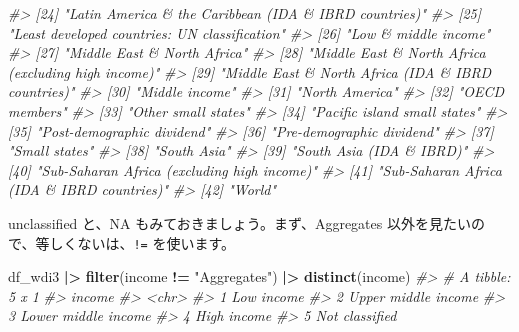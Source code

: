 \documentclass[
  xelatex, ja=standard]{bxjsbook}
\newenvironment{Shaded}{\begin{snugshade}}{\end{snugshade}}
\newcommand{\CommentTok}[1]{\textcolor[rgb]{0.56,0.35,0.01}{\textit{#1}}}
\newcommand{\FunctionTok}[1]{\textcolor[rgb]{0.13,0.29,0.53}{\textbf{#1}}}
\newcommand{\NormalTok}[1]{#1}
\newcommand{\SpecialCharTok}[1]{\textcolor[rgb]{0.81,0.36,0.00}{\textbf{#1}}}
\newcommand{\StringTok}[1]{\textcolor[rgb]{0.31,0.60,0.02}{#1}}
\theoremstyle{definition}
\theoremstyle{definition}
\theoremstyle{definition}
\theoremstyle{definition}
\theoremstyle{remark}
\begin{document}
\begin{Shaded}
\begin{Highlighting}[]
\CommentTok{\#\textgreater{} [24] "Latin America \& the Caribbean (IDA \& IBRD countries)"}
\CommentTok{\#\textgreater{} [25] "Least developed countries: UN classification"        }
\CommentTok{\#\textgreater{} [26] "Low \& middle income"                                 }
\CommentTok{\#\textgreater{} [27] "Middle East \& North Africa"                          }
\CommentTok{\#\textgreater{} [28] "Middle East \& North Africa (excluding high income)"  }
\CommentTok{\#\textgreater{} [29] "Middle East \& North Africa (IDA \& IBRD countries)"   }
\CommentTok{\#\textgreater{} [30] "Middle income"                                       }
\CommentTok{\#\textgreater{} [31] "North America"                                       }
\CommentTok{\#\textgreater{} [32] "OECD members"                                        }
\CommentTok{\#\textgreater{} [33] "Other small states"                                  }
\CommentTok{\#\textgreater{} [34] "Pacific island small states"                         }
\CommentTok{\#\textgreater{} [35] "Post{-}demographic dividend"                           }
\CommentTok{\#\textgreater{} [36] "Pre{-}demographic dividend"                            }
\CommentTok{\#\textgreater{} [37] "Small states"                                        }
\CommentTok{\#\textgreater{} [38] "South Asia"                                          }
\CommentTok{\#\textgreater{} [39] "South Asia (IDA \& IBRD)"                             }
\CommentTok{\#\textgreater{} [40] "Sub{-}Saharan Africa (excluding high income)"          }
\CommentTok{\#\textgreater{} [41] "Sub{-}Saharan Africa (IDA \& IBRD countries)"           }
\CommentTok{\#\textgreater{} [42] "World"}
\end{Highlighting}
\end{Shaded}

unclassified と、NA もみておきましょう。まず、Aggregates 以外を見たいので、等しくないは、\texttt{!=} を使います。

\begin{Shaded}
\begin{Highlighting}[]
\NormalTok{df\_wdi3 }\SpecialCharTok{|\textgreater{}} \FunctionTok{filter}\NormalTok{(income }\SpecialCharTok{!=} \StringTok{"Aggregates"}\NormalTok{) }\SpecialCharTok{|\textgreater{}} \FunctionTok{distinct}\NormalTok{(income) }
\CommentTok{\#\textgreater{} \# A tibble: 5 x 1}
\CommentTok{\#\textgreater{}   income             }
\CommentTok{\#\textgreater{}   \textless{}chr\textgreater{}              }
\CommentTok{\#\textgreater{} 1 Low income         }
\CommentTok{\#\textgreater{} 2 Upper middle income}
\CommentTok{\#\textgreater{} 3 Lower middle income}
\CommentTok{\#\textgreater{} 4 High income        }
\CommentTok{\#\textgreater{} 5 Not classified}
\end{Highlighting}
\end{Shaded}
\end{document}
